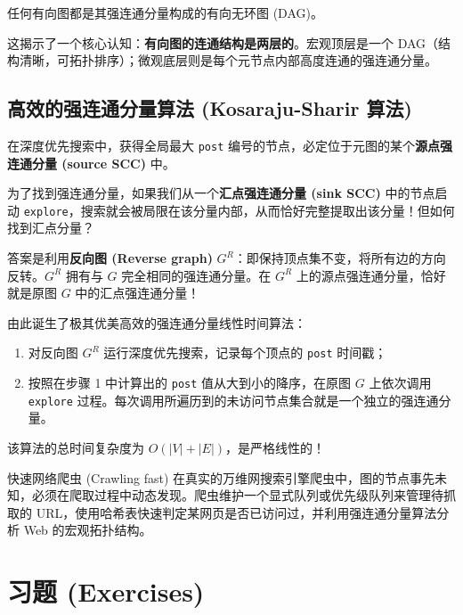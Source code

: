 \begin{property}
任何有向图都是其强连通分量构成的有向无环图 (DAG)。
\end{property}

这揭示了一个核心认知：\textbf{有向图的连通结构是两层的}。宏观顶层是一个 DAG（结构清晰，可拓扑排序）；微观底层则是每个元节点内部高度连通的强连通分量。

\subsection{高效的强连通分量算法 (Kosaraju-Sharir 算法)}

\begin{property}
在深度优先搜索中，获得全局最大 \texttt{post} 编号的节点，必定位于元图的某个\textbf{源点强连通分量 (source SCC)} 中。
\end{property}

为了找到强连通分量，如果我们从一个\textbf{汇点强连通分量 (sink SCC)} 中的节点启动 \texttt{explore}，搜索就会被局限在该分量内部，从而恰好完整提取出该分量！但如何找到汇点分量？

答案是利用\textbf{反向图 (Reverse graph)} $G^R$：即保持顶点集不变，将所有边的方向反转。$G^R$ 拥有与 $G$ 完全相同的强连通分量。在 $G^R$ 上的源点强连通分量，恰好就是原图 $G$ 中的汇点强连通分量！

由此诞生了极其优美高效的强连通分量线性时间算法：
\begin{enumerate}
    \item 对反向图 $G^R$ 运行深度优先搜索，记录每个顶点的 \texttt{post} 时间戳；
    \item 按照在步骤 1 中计算出的 \texttt{post} 值从大到小的降序，在原图 $G$ 上依次调用 \texttt{explore} 过程。每次调用所遍历到的未访问节点集合就是一个独立的强连通分量。
\end{enumerate}
该算法的总时间复杂度为 $O(|V| + |E|)$，是严格线性的！

\begin{sidebarbox}{快速网络爬虫 (Crawling fast)}
在真实的万维网搜索引擎爬虫中，图的节点事先未知，必须在爬取过程中动态发现。爬虫维护一个显式队列或优先级队列来管理待抓取的 URL，使用哈希表快速判定某网页是否已访问过，并利用强连通分量算法分析 Web 的宏观拓扑结构。
\end{sidebarbox}

\newpage
\section*{习题 (Exercises)}

